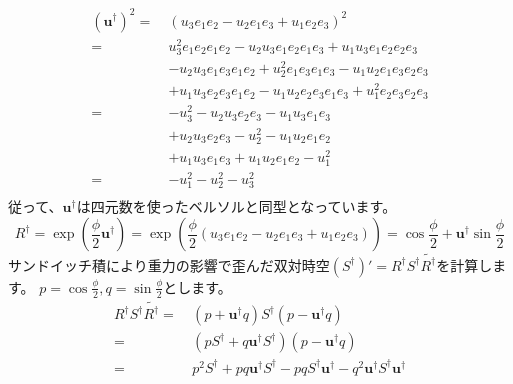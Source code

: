 \documentclass[a4paper,12pt,notitlepage]{jsreport}
\begin{document}
\begin{equation}
  \begin{split}
    (\bm{u}^\dag)^2 = ~ & (u_3 e_1e_2 - u_2 e_1e_3 + u_1 e_2e_3)^2 \\
    = ~ & u_3^2 e_1e_2e_1e_2 - u_2 u_3 e_1e_2e_1e_3 + u_1 u_3 e_1e_2e_2e_3 \\
    & - u_2 u_3 e_1e_3e_1e_2 + u_2^2 e_1e_3e_1e_3 - u_1 u_2 e_1e_3e_2e_3 \\
    & + u_1 u_3 e_2e_3e_1e_2 - u_1 u_2 e_2e_3e_1e_3 + u_1^2 e_2e_3e_2e_3 \\
    = ~ & - u_3^2 - u_2 u_3 e_2e_3 - u_1 u_3 e_1e_3 \\
    & + u_2 u_3 e_2e_3 - u_2^2 - u_1 u_2 e_1e_2 \\
    & + u_1 u_3 e_1e_3 + u_1 u_2 e_1e_2 - u_1^2 \\
    = ~ & - u_1^2 - u_2^2 - u_3^2 \\
  \end{split}
\end{equation}
従って、$ \bm{u}^\dag $は四元数を使ったベルソルと同型となっています。
\begin{equation}
  R^\dag = \exp \left(\frac{\phi}{2} \bm{u}^\dag \right)
  = \exp \left(\frac{\phi}{2}(u_3 e_1e_2 - u_2 e_1e_3 + u_1 e_2e_3) \right)
  = \cos \frac{\phi}{2} + \bm{u}^\dag \sin \frac{\phi}{2}
\end{equation}
サンドイッチ積により重力の影響で歪んだ双対時空$ (S^\dag)' = R^\dag S^\dag \widetilde{R^\dag} $を計算します。
$ p = \cos \frac{\phi}{2} , q = \sin \frac{\phi}{2} $とします。
\begin{equation}
  \begin{split}
    R^\dag S^\dag \widetilde{R^\dag} = ~ & (p + \bm{u}^\dag q)S^\dag(p - \bm{u}^\dag q) \\
    = ~ & (p S^\dag + q \bm{u}^\dag S^\dag)(p - \bm{u}^\dag q) \\
    = ~ & p^2 S^\dag + p q \bm{u}^\dag S^\dag - p q S^\dag \bm{u}^\dag - q^2 \bm{u}^\dag S^\dag \bm{u}^\dag \\
  \end{split}
\end{equation}
\end{document}
